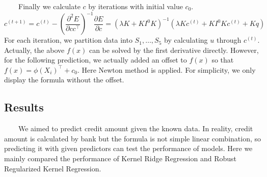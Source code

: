 \documentclass[11pt, oneside]{article}   	%
\begin{document}
~~~~Finally we calculate $c$ by iterations with initial value $c_0$.
\begin{equation}
c^{(t+1)} = c^{(t)} - \left(\frac{\partial^2E}{\partial c c^\top}\right)^{-1}\frac{\partial E}{\partial c} = \left(\lambda K + K I^0 K \right)^{-1}(\lambda K c^{(t)} + K I^0Kc^{(t)} + Kq)
\end{equation}
For each iteration, we partition data into $S_1, \ldots, S_5$ by calculating $u$ through $c^{(t)}$.  Actually, the above $f(x)$ can be solved by the first derivative directly. However, for the following prediction, we actually added an offset to $f(x)$ so that $f(x) =  \phi(X_i)^{\top} + c_0$.  Here Newton method is applied.  For simplicity, we only display the formula without the offset.


\subsection{Results}
~~~~We aimed to predict credit amount given the known data.  In reality, credit amount is calculated by bank but the formula is not simple linear combination, so predicting it with given predictors can test the performance of models.  Here we mainly compared the performance of Kernel Ridge Regression and Robust Regularized Kernel Regression.  \\
\end{document}
